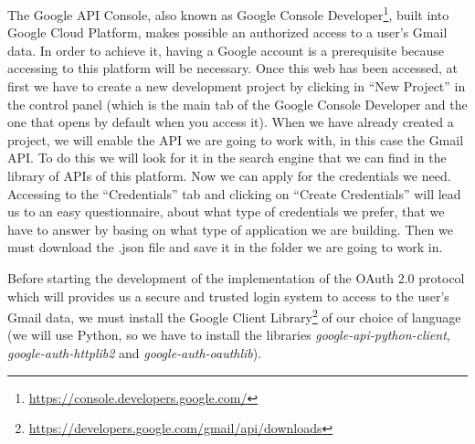 The Google API Console, also known as Google Console Developer\footnote{\url{https://console.developers.google.com/}}, built into Google Cloud Platform, makes possible an authorized access to a user's Gmail data. In order to achieve it, having a Google account is a prerequisite because accessing to this platform will be necessary. Once this web has been accessed, at first we have to create a new development project by clicking in ``New Project'' in the control panel (which is the main tab of the Google Console Developer and the one that opens by default when you access it). When we have already created a project, we will enable the API we are going to work with, in this case the Gmail API. To do this we will look for it in the search engine that we can find in the library of APIs of this platform. Now we can apply for the credentials we need. Accessing to the ``Credentials'' tab and clicking on ``Create Credentials'' will lead us to an easy questionnaire, about what type of credentials we prefer, that we have to answer by basing on what type of application we are building. Then we must download the .json file and save it in the folder we are going to work in.

Before starting the development of the implementation of the OAuth 2.0 protocol which will provides us a secure and trusted login system to access to the user's Gmail data, we must install the Google Client Library\footnote{\url{https://developers.google.com/gmail/api/downloads}} of our choice of language (we will use Python, so we have to install the libraries \textit{google-api-python-client}, \textit{google-auth-httplib2} and \textit{google-auth-oauthlib}).